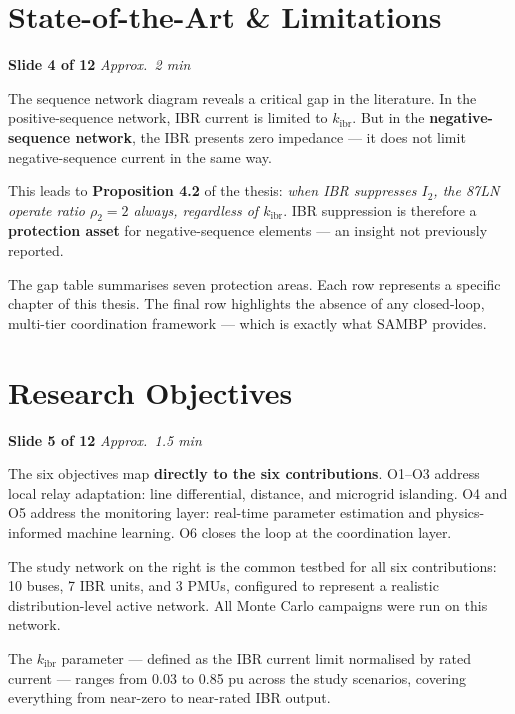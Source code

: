 \documentclass[12pt, a4paper]{article}
\newenvironment{notebox}{%
  \begin{tcolorbox}[
    colback=noteBg,
    colframe=iitmMaroon!40,
    boxrule=0.6pt,
    arc=3pt,
    left=8pt, right=8pt, top=6pt, bottom=6pt
  ]
  \setstretch{1.4}\small
}{%
  \end{tcolorbox}
}
\newcommand{\slidetag}[2]{%
  \noindent
  \textcolor{slideNum}{\footnotesize\bfseries Slide #1} \hfill
  \textcolor{iitmGold!80!black}{\footnotesize\itshape Approx.\ #2}\\[2pt]
}
\begin{document}
\section{State-of-the-Art \& Limitations}

\slidetag{4 of 12}{2 min}
\begin{notebox}
The sequence network diagram reveals a critical gap in the literature.
In the positive-sequence network, IBR current is limited to $k_\text{ibr}$.
But in the \textbf{negative-sequence network}, the IBR presents zero impedance ---
it does not limit negative-sequence current in the same way.

This leads to \textbf{Proposition 4.2} of the thesis:
\emph{when IBR suppresses $I_2$, the 87LN operate ratio $\rho_2 = 2$ always,
regardless of $k_\text{ibr}$}. IBR suppression is therefore a \textbf{protection asset}
for negative-sequence elements --- an insight not previously reported.

The gap table summarises seven protection areas. Each row represents a specific chapter
of this thesis. The final row highlights the absence of any closed-loop, multi-tier
coordination framework --- which is exactly what SAMBP provides.
\end{notebox}

\section{Research Objectives}

\slidetag{5 of 12}{1.5 min}
\begin{notebox}
The six objectives map \textbf{directly to the six contributions}.
O1--O3 address local relay adaptation: line differential, distance, and microgrid
islanding. O4 and O5 address the monitoring layer: real-time parameter estimation and
physics-informed machine learning. O6 closes the loop at the coordination layer.

The study network on the right is the common testbed for all six contributions: 10 buses,
7 IBR units, and 3 PMUs, configured to represent a realistic distribution-level active
network. All Monte Carlo campaigns were run on this network.

The $k_\text{ibr}$ parameter --- defined as the IBR current limit normalised by rated
current --- ranges from 0.03 to 0.85 pu across the study scenarios, covering everything
from near-zero to near-rated IBR output.
\end{notebox}
\end{document}
